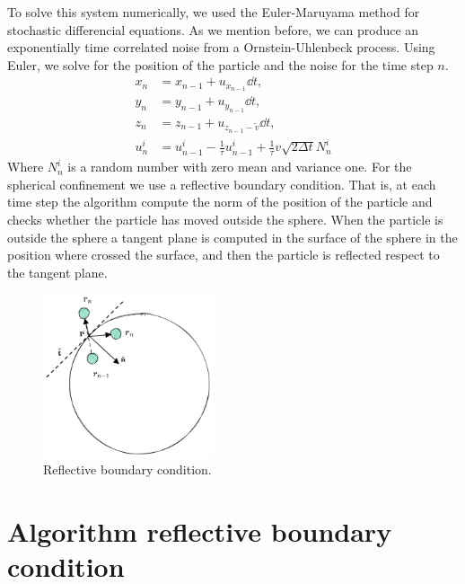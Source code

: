 \documentclass[%
10pt,
superscriptaddress,
twocolumn,
 amsmath,amssymb,
 aps,prx,
]{revtex4-2}
\begin{document}
To solve this system numerically, we used the Euler-Maruyama method for stochastic differencial equations.
As we mention before, we can produce an exponentially time correlated noise from a Ornstein-Uhlenbeck process.
Using Euler, we solve for the position of the particle and the noise for the time step $n$.
\begin{align}
   \label{eq:Euler_method}
   x_n&=x_{n-1}+u_{x_{n-1}}\dd t,\\
   y_n&=y_{n-1}+u_{y_{n-1}}\dd t,\\
   z_n&=z_{n-1}+u_{z_{n-1}-\tilde{v}}\dd t,\\
   u^i_{n}&=u^i_{n-1}-\frac{1}{\tau}u^i_{n-1}+\frac{1}{\tau}v\sqrt{2\Delta t}N^i_{n}
\end{align}
Where $N^{i}_n$ is a random number with zero mean and variance one. For the spherical confinement we use a reflective boundary condition. 
That is, at each time step the algorithm compute the norm of the position of the particle and checks whether the particle has moved outside the sphere. 
When the particle is outside the sphere a tangent plane is computed in the surface of the sphere in the position where crossed the surface, and then the particle is reflected respect to the tangent plane. 
\begin{figure}[!h]
  \includegraphics[width=5cm]{ReflectiveBoundary.png}
  \caption{
  Reflective boundary condition.
  }
  \label{fig:reflective_boundary}
\end{figure}
\label{Reflective.Boundary.condition}
    \section{Algorithm reflective boundary condition}
\end{document}
